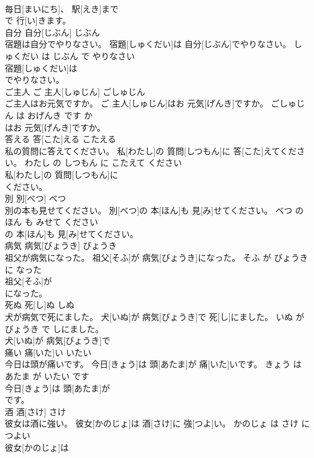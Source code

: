\documentclass[8pt]{extreport}
\begin{document}
\begin{CJK}{UTF8}{min}
\\	毎日[まいにち]、 駅[えき]まで
\\	で 行[い]きます。			
\\	自分	自分[じぶん]	じぶん	
\\	宿題は自分でやりなさい。	宿題[しゅくだい]は 自分[じぶん]でやりなさい。	しゅくだい は じぶん で やりなさい	
\\	宿題[しゅくだい]は
\\	でやりなさい。			
\\	ご主人	ご 主人[しゅじん]	ごしゅじん	
\\	ご主人はお元気ですか。	ご 主人[しゅじん]はお 元気[げんき]ですか。	ごしゅじん は おげんき です か	
\\	はお 元気[げんき]ですか。			
\\	答える	答[こた]える	こたえる	
\\	私の質問に答えてください。	私[わたし]の 質問[しつもん]に 答[こた]えてください。	わたし の しつもん に こたえて ください	
\\	私[わたし]の 質問[しつもん]に
\\	ください。			
\\	別	別[べつ]	べつ	
\\	別の本も見せてください。	別[べつ]の 本[ほん]も 見[み]せてください。	べつ の ほん も みせて ください	
\\	の 本[ほん]も 見[み]せてください。			
\\	病気	病気[びょうき]	びょうき	
\\	祖父が病気になった。	祖父[そふ]が 病気[びょうき]になった。	そふ が びょうき に なった	
\\	祖父[そふ]が
\\	になった。			
\\	死ぬ	死[し]ぬ	しぬ	
\\	犬が病気で死にました。	犬[いぬ]が 病気[びょうき]で 死[し]にました。	いぬ が びょうき で しにました。	
\\	犬[いぬ]が 病気[びょうき]で
\\	痛い	痛[いた]い	いたい	
\\	今日は頭が痛いです。	今日[きょう]は 頭[あたま]が 痛[いた]いです。	きょう は あたま が いたい です	
\\	今日[きょう]は 頭[あたま]が
\\	です。			
\\	酒	酒[さけ]	さけ	
\\	彼女は酒に強い。	彼女[かのじょ]は 酒[さけ]に 強[つよ]い。	かのじょ は さけ に つよい	
\\	彼女[かのじょ]は

\end{CJK}
\end{document}
